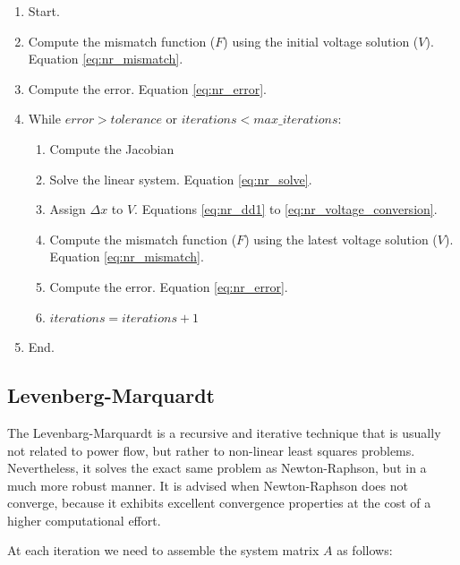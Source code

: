 \documentclass[a4paper,twoside,fleqn]{tufte-book}
\begin{document}
\begin{enumerate}

\item Start.

\item Compute the mismatch function ($F$) using the initial voltage solution ($V$). Equation \ref{eq:nr_mismatch}.

\item Compute the error. Equation \ref{eq:nr_error}.

\item While $error > tolerance$ or $iterations < max\_iterations$:

	\begin{enumerate}
	\item Compute the Jacobian
	
	\item Solve the linear system. Equation \ref{eq:nr_solve}.
	
	\item Assign $\Delta x$ to $V$. Equations \ref{eq:nr_dd1} to \ref{eq:nr_voltage_conversion}.
	
	\item Compute the mismatch function ($F$) using the latest voltage solution ($V$). Equation \ref{eq:nr_mismatch}.
	
	\item Compute the error. Equation \ref{eq:nr_error}.
	
	\item $iterations = iterations + 1$
	\end{enumerate}

\item End.
\end{enumerate}



\newpage
\subsection{Levenberg-Marquardt} \label{LM-Method}

The Levenbarg-Marquardt is a recursive and iterative technique that is usually not related to power flow, but rather to non-linear least squares problems. Nevertheless, it solves the exact same problem as Newton-Raphson, but in a much more robust manner. It is advised when Newton-Raphson does not converge, because it exhibits excellent convergence properties at the cost of a higher computational effort.


At each iteration we need to assemble the system matrix $A$ as follows:
%
%
%
\end{document}
